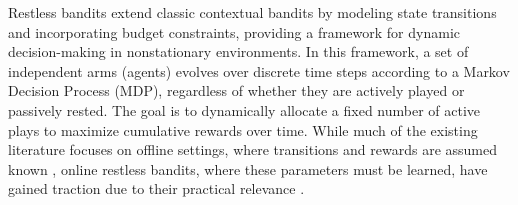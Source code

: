 Restless bandits extend classic contextual bandits by modeling state transitions and incorporating budget constraints, providing a framework for dynamic decision-making in nonstationary environments. In this framework, a set of independent arms (agents) evolves over discrete time steps according to a Markov Decision Process (MDP), regardless of whether they are actively played or passively rested. The goal is to dynamically allocate a fixed number of active plays to maximize cumulative rewards over time. While much of the existing literature focuses on offline settings, where transitions and rewards are assumed known \citep{whittle1988restless,hong2024achievingexponentialasymptoticoptimality}, online restless bandits, where these parameters must be learned, have gained traction due to their practical relevance \citep{jung2019regret}.



